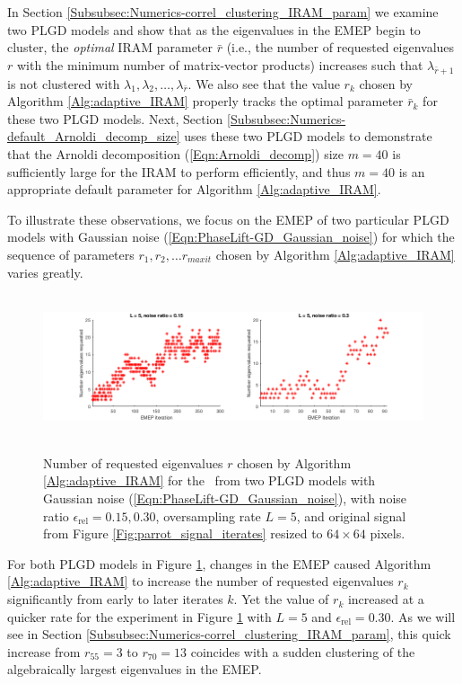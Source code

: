In Section \ref{Subsubsec:Numerics-correl_clustering_IRAM_param} we examine two PLGD models and show that as the eigenvalues in the EMEP begin to cluster, the \textit{optimal} IRAM parameter $\bar{r}$ (i.e., the number of requested eigenvalues $r$ with the minimum number of matrix-vector products) increases such that $\lambda_{\bar{r}+1}$ is not clustered with $\lambda_1, \lambda_2, \ldots, \lambda_{\bar{r}}$.
We also see that the value $r_k$ chosen by Algorithm \ref{Alg:adaptive_IRAM} properly tracks the optimal parameter $\bar{r}_k$ for these two PLGD models.
Next, Section \ref{Subsubsec:Numerics-default_Arnoldi_decomp_size} uses these two PLGD models to demonstrate that the Arnoldi decomposition (\ref{Eqn:Arnoldi_decomp}) size $m=40$ is sufficiently large for the IRAM to perform efficiently, and thus $m=40$ is an appropriate default parameter for Algorithm \ref{Alg:adaptive_IRAM}.





To illustrate these observations, we focus on the EMEP of two particular PLGD models with Gaussian noise (\ref{Eqn:PhaseLift-GD_Gaussian_noise}) for which the sequence of parameters $r_1, r_2, \ldots r_{maxit}$ chosen by Algorithm \ref{Alg:adaptive_IRAM} varies greatly.

\begin{figure}[H]
\centering
\hbox{\hspace{-1.8cm} \includegraphics[scale=0.6]{Numerics-num_eigs_req_ada_2_exps} }\vspace{0.0cm}
	\caption{
Number of requested eigenvalues $r$ chosen by Algorithm \ref{Alg:adaptive_IRAM} for the \emep \ from two PLGD models with Gaussian noise (\ref{Eqn:PhaseLift-GD_Gaussian_noise}), with noise ratio $\epsilon_\text{rel}=0.15, 0.30$, oversampling rate $L=5$, and original signal from Figure \ref{Fig:parrot_signal_iterates} resized to $64 \times 64$ pixels.
}
\label{Fig:Numerics-num_req_eigs_2_exps}
\end{figure}



For both PLGD models in Figure \ref{Fig:Numerics-num_req_eigs_2_exps}, changes in the EMEP caused Algorithm \ref{Alg:adaptive_IRAM} to increase the number of requested eigenvalues $r_k$ significantly from early to later iterates $k$.
Yet the value of $r_k$ increased at a quicker rate for the experiment in Figure \ref{Fig:Numerics-num_req_eigs_2_exps} with $L=5$ and $\epsilon_\text{rel} = 0.30$.
As we will see in Section \ref{Subsubsec:Numerics-correl_clustering_IRAM_param}, this quick increase from $r_{55}=3$ to $r_{70}=13$ coincides with a sudden clustering of the algebraically largest eigenvalues in the EMEP.





